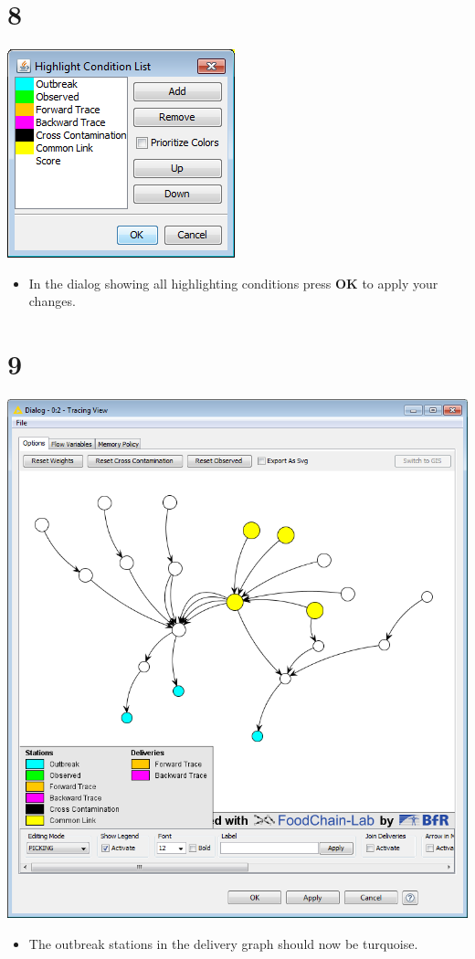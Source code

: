 \documentclass{beamer}
\begin{document}
\section{8}
\begin{frame}
	\begin{center}
  		\includegraphics[height=0.6\textheight]{8.png}
	\end{center}
	\begin{itemize}
		\item In the dialog showing all highlighting conditions press \textbf{OK} to apply your changes.
	\end{itemize}
\end{frame}

\section{9}
\begin{frame}
	\begin{center}
  		\includegraphics[height=0.6\textheight]{9.png}
	\end{center}
	\begin{itemize}
		\item The outbreak stations in the delivery graph should now be turquoise.
	\end{itemize}
\end{frame}
\end{document}
